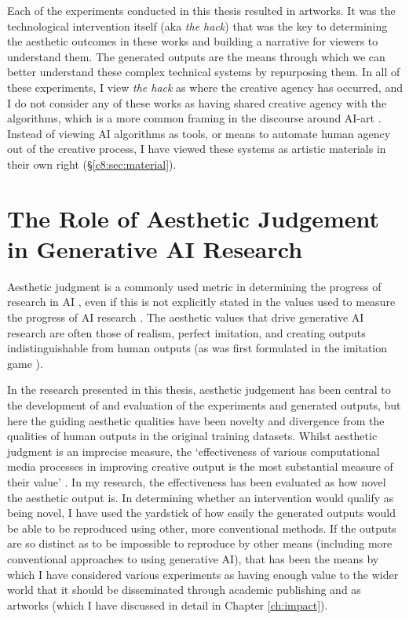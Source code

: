 Each of the experiments conducted in this thesis resulted in artworks.
It was the technological intervention itself (aka \textit{the hack}) that was the key to determining the aesthetic outcomes in these works and building a narrative for viewers to understand them.
The generated outputs are the means through which we can better understand these complex technical systems by repurposing them.
In all of these experiments, I view \textit{the hack} as where the creative agency has occurred, and I do not consider any of these works as having shared creative agency with the algorithms, which is a more common framing in the discourse around AI-art \citep{moruzzi2022creative}.
Instead of viewing AI algorithms as tools, or means to automate human agency out of the creative process, I have viewed these systems as artistic materials in their own right (\S \ref{c8:sec:material}).

\section{The Role of Aesthetic Judgement in Generative AI Research}
\label{c8:sec:aesthetic}

Aesthetic judgment is a commonly used metric in determining the progress of research in AI \citep{stanley2018art}, even if this is not explicitly stated in the values used to measure the progress of AI research \citep{birhane2022values}.
The aesthetic values that drive generative AI research are often those of realism, perfect imitation, and creating outputs indistinguishable from human outputs (as was first formulated in the imitation game \citep{machinery1950computing}). 

In the research presented in this thesis, aesthetic judgement has been central to the development of and evaluation of the experiments and generated outputs, but here the guiding aesthetic qualities have been novelty and divergence from the qualities of human outputs in the original training datasets.
Whilst aesthetic judgment is an imprecise measure, the `effectiveness of various computational media processes in improving creative output is the most substantial measure of their value' \citep{brown2009integrating}. 
In my research, the effectiveness has been evaluated as how novel the aesthetic output is. 
In determining whether an intervention would qualify as being novel, I have used the yardstick of how easily the generated outputs would be able to be reproduced using other, more conventional methods.
If the outputs are so distinct as to be impossible to reproduce by other means (including more conventional approaches to using generative AI), that has been the means by which I have considered various experiments as having enough value to the wider world that it should be disseminated through academic publishing and as artworks (which I have discussed in detail in Chapter \ref{ch:impact}).

